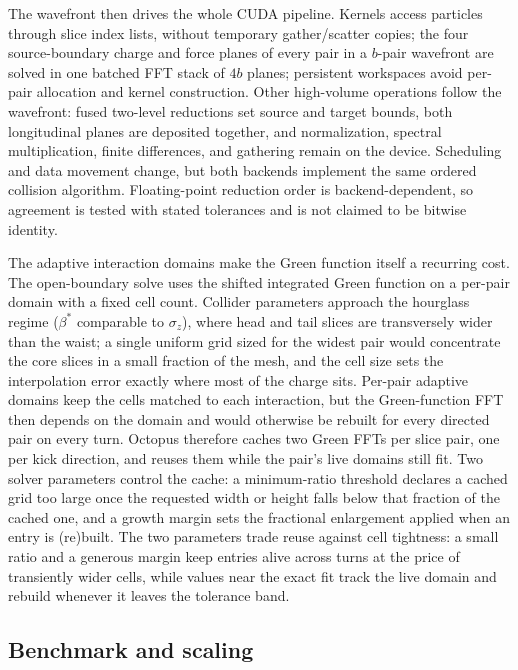 \documentclass[a4paper,fleqn]{cas-sc}
\begin{document}
The wavefront then drives the whole CUDA pipeline.  Kernels access particles
through slice index lists, without temporary gather/scatter copies; the four
source-boundary charge and force planes of every pair in a $b$-pair
wavefront are solved in one batched FFT stack of $4b$ planes; persistent
workspaces avoid per-pair allocation and kernel construction.
Other high-volume operations follow the wavefront: fused two-level reductions
set source and target bounds, both longitudinal planes are deposited together,
and normalization, spectral multiplication, finite differences, and gathering
remain on the device.  Scheduling and data movement change, but both backends
implement the same ordered collision algorithm.  Floating-point reduction
order is backend-dependent, so agreement is tested with stated tolerances and
is not claimed to be bitwise identity.

The adaptive interaction domains make the Green function itself a recurring
cost.  The open-boundary solve uses the shifted integrated Green function
\citep{QiangGreen2002,QiangIGF2006} on a per-pair domain with a fixed cell
count.  Collider parameters approach the hourglass regime ($\beta^*$
comparable to $\sigma_z$), where head and tail slices are transversely wider
than the waist; a single uniform grid sized for the widest pair would
concentrate the core slices in a small fraction of the mesh, and the cell
size sets the interpolation error exactly where most of the charge sits.
Per-pair adaptive domains keep the cells matched to each interaction, but
the Green-function FFT then depends on the domain and would otherwise be
rebuilt for every directed pair on every turn.  Octopus therefore caches two
Green FFTs per slice pair, one per kick direction, and reuses them while the
pair's live domains still fit.  Two solver parameters control the cache: a
minimum-ratio threshold declares a cached grid too large once the requested
width or height falls below that fraction of the cached one, and a growth
margin sets the fractional enlargement applied when an
entry is (re)built.  The two parameters trade reuse against cell tightness:
a small ratio and a generous margin keep entries alive across turns at the
price of transiently wider cells, while values near the exact fit track the
live domain and rebuild whenever it leaves the tolerance band.

\subsection{Benchmark and scaling}
\end{document}
